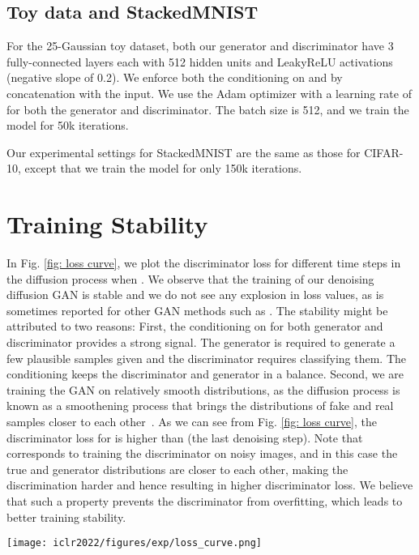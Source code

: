 \subsection{Toy data and StackedMNIST}
For the 25-Gaussian toy dataset, both our generator and discriminator have 3 fully-connected layers each with 512 hidden units and LeakyReLU activations (negative slope of 0.2). We enforce both the conditioning on  and  by concatenation with the input. We use the Adam optimizer with a learning rate of  for both the generator and discriminator. The batch size is 512, and we train the model for 50k iterations.

Our experimental settings for StackedMNIST are the same as those for CIFAR-10, except that we train the model for only 150k iterations. 


\section{Training Stability} \label{sec: stability}
In Fig. \ref{fig: loss curve}, we plot the discriminator loss for different time steps in the diffusion process when . We observe that the training of our denoising diffusion GAN is stable and we do not see any explosion in loss values, as is sometimes reported for other GAN methods such as \cite{brock2018large}. The stability might be attributed to two reasons: First, the conditioning on  for both generator and discriminator provides a strong signal. The generator is required to generate a few plausible samples given  and the discriminator requires classifying them. The  conditioning keeps the discriminator and generator in a balance. Second, we are training the GAN on relatively smooth distributions, as the diffusion process is known as a smoothening process that brings the distributions of fake and real samples closer to each other~\citep{lyu2012interpretation}. As we can see from Fig. \ref{fig: loss curve}, the discriminator loss for  is higher than  (the last denoising step). Note that  corresponds to training the discriminator on noisy images, and in this case the true and generator distributions are closer to each other, making the discrimination harder and hence resulting in higher discriminator loss. We believe that such a property prevents the discriminator from overfitting, which leads to better training stability.

\begin{figure*}[ht]
    \centering
    \texttt{[image: iclr2022/figures/exp/loss\_curve.png]}
    \caption{\label{fig: loss curve}
     The discriminator loss per denoising step during training.}
\end{figure*}

